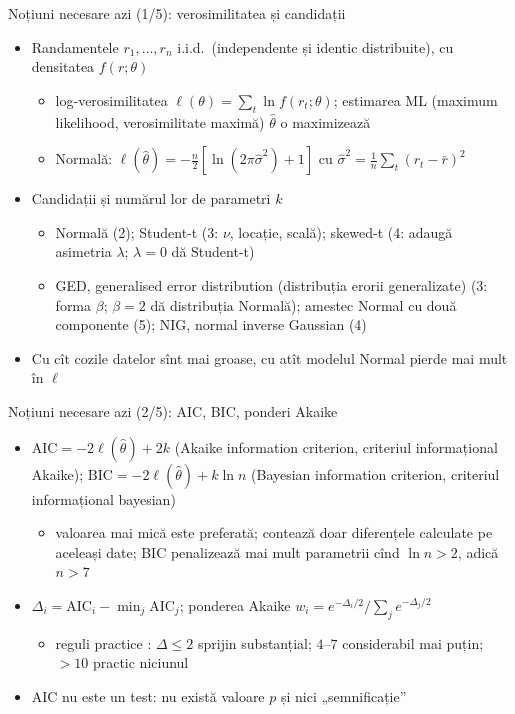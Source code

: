 \begin{frame}{Noțiuni necesare azi (1/5): verosimilitatea și candidații}
\itemsize{\small}
\begin{itemize}
    \item Randamentele $r_1, \dots, r_n$ i.i.d.\ (independente și identic distribuite), cu densitatea $f(r; \theta)$
    \begin{itemize}
        \item log-verosimilitatea $\ell(\theta) = \sum_t \ln f(r_t; \theta)$; estimarea ML (maximum likelihood, verosimilitate maximă) $\hat\theta$ o maximizează
        \item Normală: $\ell(\hat\theta) = -\frac{n}{2}[\ln(2\pi\hat\sigma^2) + 1]$ cu $\hat\sigma^2 = \frac{1}{n}\sum_t (r_t - \bar r)^2$
    \end{itemize}
    \item Candidații și numărul lor de parametri $k$
    \begin{itemize}
        \item Normală (2); Student-t (3: $\nu$, locație, scală); skewed-t (4: adaugă asimetria $\lambda$; $\lambda = 0$ dă Student-t)
        \item GED, generalised error distribution (distribuția erorii generalizate) (3: forma $\beta$; $\beta = 2$ dă distribuția Normală); amestec Normal cu două componente (5); NIG, normal inverse Gaussian (4)
    \end{itemize}
    \item Cu cît cozile datelor sînt mai groase, cu atît modelul Normal pierde mai mult în $\ell$
\end{itemize}
\end{frame}

\begin{frame}{Noțiuni necesare azi (2/5): AIC, BIC, ponderi Akaike}
\itemsize{\small}
\begin{itemize}
    \item $\mathrm{AIC} = -2\ell(\hat\theta) + 2k$ (Akaike information criterion, criteriul informațional Akaike); $\mathrm{BIC} = -2\ell(\hat\theta) + k\ln n$ (Bayesian information criterion, criteriul informațional bayesian)
    \begin{itemize}
        \item valoarea mai mică este preferată; contează doar diferențele calculate pe aceleași date; BIC penalizează mai mult parametrii cînd $\ln n > 2$, adică $n > 7$
    \end{itemize}
    \item $\Delta_i = \mathrm{AIC}_i - \min_j \mathrm{AIC}_j$; ponderea Akaike $w_i = e^{-\Delta_i/2}/\sum_j e^{-\Delta_j/2}$
    \begin{itemize}
        \item reguli practice : $\Delta \le 2$ sprijin substanțial; $4$--$7$ considerabil mai puțin; $> 10$ practic niciunul
    \end{itemize}
    \item AIC nu este un test: nu există valoare $p$ și nici „semnificație”
\end{itemize}
\end{frame}

